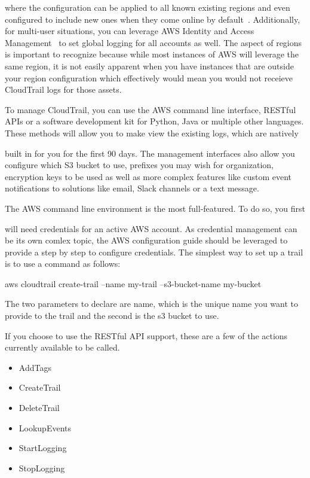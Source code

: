 where the configuration can be applied to all known existing regions and even 
configured to include new ones when they come online by 
default~\cite{hid-sp18-518-CloudTrail-global-events}. Additionally, 
for multi-user situations, you can leverage AWS Identity and Access 
Management~\cite{hid-sp18-518-CloudTrail-IAM} to set global logging for all 
accounts as well. The aspect of regions is important to recognize because 
while most instances of AWS will leverage the same region, it is not easily
apparent when you have instances that are outside your region configuration
which effectively would mean you would not receieve CloudTrail logs for 
those assets.

To manage CloudTrail, you can use the AWS command line interface, RESTful APIs
or a software development kit for Python, Java or multiple other languages. 
These methods will allow you to make view the existing logs, which are natively

built in for you for the first 90 days. The management interfaces also allow
you configure which S3 bucket to use, prefixes you may wish for organization, 
encryption keys to be used as well as more complex features like custom event
notifications to solutions like email, Slack channels or a text message.

The AWS command line environment is the most full-featured. To do so, you first

will need credentials for an active AWS account. As credential management can 
be its own comlex topic,  the AWS configuration guide should be leveraged to 
provide a step by step to configure credentials. The simplest way to set up a 
trail is to use a command as follows: 

aws cloudtrail create-trail --name my-trail --s3-bucket-name my-bucket

The two parameters to declare are name, which is the unique name you want to 
provide to the trail and the second is the s3 bucket to use.

If you choose to use the RESTful API support, these are a few of
the actions currently available to be called.

\begin{itemize}
\item AddTags
\item CreateTrail
\item DeleteTrail
\item LookupEvents
\item StartLogging
\item StopLogging
\end{itemize}

